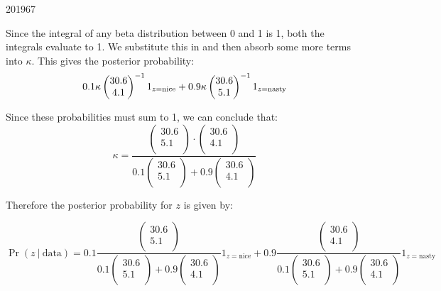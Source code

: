 \documentclass[10pt,\jkfside,a4paper]{article}
\begin{document}
\begin{examquestion}{2019}{6}{7}
\begin{enumerate}[label=(\alph*)]
Since the integral of any beta distribution between 0 and 1 is 1, both the
integrals evaluate to 1. We substitute this in and then absorb some more terms
into $\kappa$. This gives the posterior probability:
\[
0.1\kappa\begin{pmatrix} 30.6 \\ 4.1 \\ \end{pmatrix}^{-1}
1_{z=\text{nice}} + 0.9\kappa\begin{pmatrix}
30.6 \\ 5.1 \\ \end{pmatrix}^{-1}1_{z=\text{nasty}} \\
\]

Since these probabilities must sum to 1, we can conclude that:
\[
\kappa = \frac{\begin{pmatrix} 30.6 \\ 5.1
 \\ \end{pmatrix} \cdot \begin{pmatrix} 30.6 \\ 4.1 \\ \end{pmatrix}}{0.1\begin{pmatrix} 30.6 \\ 5.1 \\ \end{pmatrix} +
0.9\begin{pmatrix} 30.6 \\ 4.1 \\ \end{pmatrix}}
\]

Therefore the posterior probability for $z$ is given by:

\[
\Pr(z \ | \ \text{data}) = 0.1\frac{\begin{pmatrix} 30.6 \\ 5.1
 \\ \end{pmatrix} }{0.1\begin{pmatrix} 30.6 \\ 5.1 \\ \end{pmatrix} +
0.9\begin{pmatrix} 30.6 \\ 4.1 \\ \end{pmatrix}}
1_{z=\text{nice}} + 0.9\frac{ \begin{pmatrix} 30.6 \\ 4.1 \\ \end{pmatrix}}{0.1\begin{pmatrix} 30.6 \\ 5.1 \\ \end{pmatrix} +
0.9\begin{pmatrix} 30.6 \\ 4.1 \\ \end{pmatrix}}1_{z=\text{nasty}}
\]


\end{enumerate}
\end{examquestion}
\end{document}
